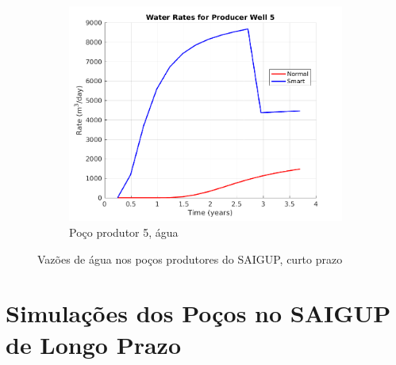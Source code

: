 \begin{figure}[!ht]
	\begin{subfigure}[b]{.45\textwidth}
		\includegraphics[width=\textwidth]{figs/resultadosSSAIGUP/SSAIGUP_WaterWell5_Zoom}
		\caption{Po\c{c}o produtor 5, \'{a}gua}
		\label{SSAIGUP_WaterWell5}
	\end{subfigure}
	\caption{Vaz\~{o}es de \'{a}gua nos po\c{c}os produtores do SAIGUP, curto prazo}
	\label{SSAIGUP_WaterRates}
\end{figure}


\chapter{Simula\c{c}\~{o}es dos Po\c{c}os no SAIGUP de Longo Prazo}\label{apn:lSAIGUP}


